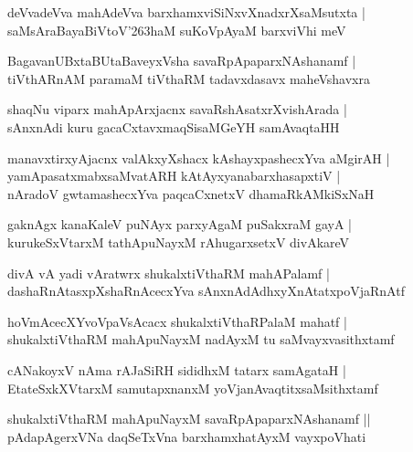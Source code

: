 \documentclass[twoside,12pt,openright]{book}
\def\S{\char'263}
\newcounter{shloka}[chapter]
\begin{document}
\begin{shloka}
deVvadeVva mahAdeVva barxhamxviSiNxvXnadxrXsaMsutxta |\\
saMsAraBayaBiVtoV\S haM suKoVpAyaM barxviVhi meV 
\end{shloka}

\begin{shloka}
BagavanUBxtaBUtaBaveyxVsha savaRpApaparxNAshanamf |\\
tiVthARnAM paramaM tiVthaRM tadavxdasavx maheVshavxra
\end{shloka}

\begin{shloka}
shaqNu viparx mahApArxjacnx savaRshAsatxrXvishArada |\\
sAnxnAdi kuru gacaCxtavxmaqSisaMGeYH samAvaqtaHH 
\end{shloka}

\begin{shloka}
manavxtirxyAjacnx valAkxyXshacx kAshayxpashecxYva aMgirAH |\\
yamApasatxmabxsaMvatARH kAtAyxyanabarxhasapxtiV |\\
nAradoV gwtamashecxYva paqcaCxnetxV dhamaRkAMkiSxNaH 
\end{shloka}

\begin{shloka}
gaknAgx kanaKaleV puNAyx parxyAgaM puSakxraM gayA |\\
kurukeSxVtarxM tathApuNayxM rAhugarxsetxV divAkareV 
\end{shloka}

\begin{shloka}
divA vA yadi vAratwrx shukalxtiVthaRM mahAPalamf |\\
dashaRnAtasxpXshaRnAcecxYva sAnxnAdAdhxyXnAtatxpoVjaRnAtf
\end{shloka}

\begin{shloka}
hoVmAcecXYvoVpaVsAcacx shukalxtiVthaRPalaM mahatf |\\
shukalxtiVthaRM mahApuNayxM nadAyxM tu saMvayxvasithxtamf 
\end{shloka}

\begin{shloka}
cANakoyxV nAma rAJaSiRH sididhxM tatarx samAgataH |\\
EtateSxkXVtarxM samutapxnanxM yoVjanAvaqtitxsaMsithxtamf 
\end{shloka}

\begin{shloka}
shukalxtiVthaRM mahApuNayxM savaRpApaparxNAshanamf ||\\
pAdapAgerxVNa daqSeTxVna barxhamxhatAyxM vayxpoVhati
\end{shloka}
\end{document}
